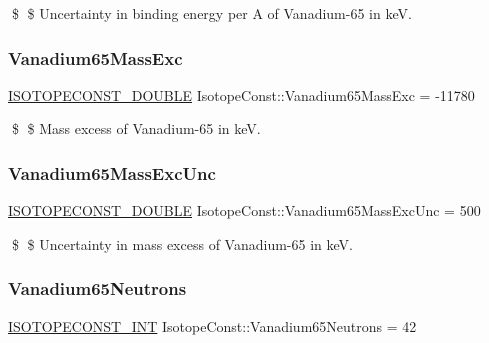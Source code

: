 \$ \$ Uncertainty in binding energy per A of Vanadium-\/65 in keV. \mbox{\label{group___isotope_const-_vanadium-_v65_gaab2dbf4d8a238cef86316a9eec1a65a8}} 
\subsubsection{\texorpdfstring{Vanadium65\+Mass\+Exc}{Vanadium65MassExc}}
{\footnotesize\ttfamily \mbox{\hyperlink{group___isotope_const-_macros_ga8f45a7272ce02c0b4c65c44636ed719a}{I\+S\+O\+T\+O\+P\+E\+C\+O\+N\+S\+T\+\_\+\+D\+O\+U\+B\+LE}} Isotope\+Const\+::\+Vanadium65\+Mass\+Exc = -\/11780}

\$ \$ Mass excess of Vanadium-\/65 in keV. \mbox{\label{group___isotope_const-_vanadium-_v65_ga1a157843b80a9b72aa3b9cc9b0b2b98b}} 
\subsubsection{\texorpdfstring{Vanadium65\+Mass\+Exc\+Unc}{Vanadium65MassExcUnc}}
{\footnotesize\ttfamily \mbox{\hyperlink{group___isotope_const-_macros_ga8f45a7272ce02c0b4c65c44636ed719a}{I\+S\+O\+T\+O\+P\+E\+C\+O\+N\+S\+T\+\_\+\+D\+O\+U\+B\+LE}} Isotope\+Const\+::\+Vanadium65\+Mass\+Exc\+Unc = 500}

\$ \$ Uncertainty in mass excess of Vanadium-\/65 in keV. \mbox{\label{group___isotope_const-_vanadium-_v65_gaeefca1b1173fd35e8a4c9c31e2a463f3}} 
\subsubsection{\texorpdfstring{Vanadium65\+Neutrons}{Vanadium65Neutrons}}
{\footnotesize\ttfamily \mbox{\hyperlink{group___isotope_const-_macros_ga5f18360b3e99483a35c32d789e62621c}{I\+S\+O\+T\+O\+P\+E\+C\+O\+N\+S\+T\+\_\+\+I\+NT}} Isotope\+Const\+::\+Vanadium65\+Neutrons = 42}


